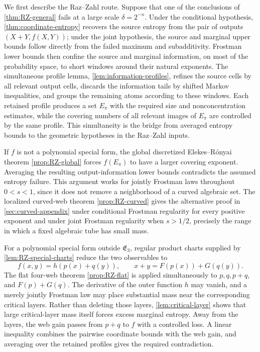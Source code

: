 \documentclass[11pt]{article}
\begin{document}
We first describe the Raz--Zahl route.  Suppose that one of the
conclusions of \cref{thm:RZ-general} fails at a large scale
\(\delta=2^{-n}\).  Under the conditional hypothesis,
\cref{thm:coordinate-entropy} recovers the source entropy from the
pair of outputs \((X+Y,f(X,Y))\); under the joint hypothesis, the
source and marginal upper bounds follow directly from the failed
maximum and subadditivity.  Frostman lower bounds then confine the
source and marginal information, on most of the probability space,
to short windows around their natural exponents.  The simultaneous
profile lemma, \cref{lem:information-profiles}, refines the source
cells by all relevant output cells, discards the information tails by
shifted Markov inequalities, and groups the remaining atoms according
to these windows.  Each retained profile produces a set
\(E_\pi\) with the required size and nonconcentration estimates, while
the covering numbers of all relevant images of \(E_\pi\) are controlled
by the same profile.  This simultaneity is the bridge from averaged
entropy bounds to the geometric hypotheses in the Raz--Zahl inputs.

If \(f\) is not a polynomial special form, the global discretized
Elekes--R\'onyai theorem \cref{prop:RZ-global} forces
\(f(E_\pi)\) to have a larger covering exponent.  Averaging the
resulting output-information lower bounds contradicts the assumed
entropy failure.  This argument works for jointly Frostman laws
throughout \(0<s<1\), since it does not remove a neighborhood of a
curved algebraic set.  The localized curved-web theorem
\cref{prop:RZ-curved} gives the alternative proof in
\cref{sec:curved-appendix} under conditional
Frostman regularity for every positive exponent and under joint
Frostman regularity when \(s>1/2\), precisely the range in which a
fixed algebraic tube has small mass.

For a polynomial special form outside \(\mathfrak E_3\), regular
product charts supplied by \cref{lem:RZ-special-charts} reduce the
two observables to
\[
 f(x,y)=h(p(x)+q(y)),
 \qquad
 x+y=F(p(x))+G(q(y)).
\]
The flat four-web theorem \cref{prop:RZ-flat} is applied
simultaneously to \(p,q,p+q\), and \(F(p)+G(q)\).  The derivative of
the outer function \(h\) may vanish, and a merely jointly Frostman law
may place substantial mass near the corresponding critical layers.
Rather than deleting those layers, \cref{lem:critical-layer} shows
that large critical-layer mass itself forces excess marginal entropy.
Away from the layers, the web gain passes from \(p+q\) to \(f\) with
a controlled loss.  A linear inequality combines the pairwise
coordinate bounds with the web gain, and averaging over the retained
profiles gives the required contradiction.
\end{document}
